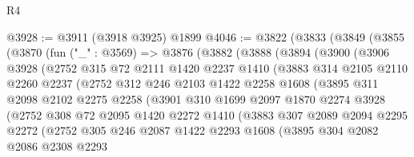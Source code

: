 \begin{lexlean}{R4}
\begin{coremodule}
@3928 := @3911 (@3918 @3925) @1899
@4046 := @3822
    (@3833
      (@3849
        (@3855
          (@3870
            (fun ("_" : @3569) =>
            @3876
              (@3882
                (@3888
                  (@3894
                    (@3900
                      (@3906
                        @3928
                        (@2752
                          @315
                          @72
                          @2111
                          @1420
                          @2237
                          @1410
                          (@3883
                            @314
                            @2105
                            @2110
                            @2260
                            @2237
                            (@2752
                              @312
                              @246
                              @2103
                              @1422
                              @2258
                              @1608
                              (@3895
                                @311
                                @2098
                                @2102
                                @2275
                                @2258
                                (@3901
                                  @310
                                  @1699
                                  @2097
                                  @1870
                                  @2274
                                  @3928
                                  (@2752
                                    @308
                                    @72
                                    @2095
                                    @1420
                                    @2272
                                    @1410
                                    (@3883
                                      @307
                                      @2089
                                      @2094
                                      @2295
                                      @2272
                                      (@2752
                                        @305
                                        @246
                                        @2087
                                        @1422
                                        @2293
                                        @1608
                                        (@3895
                                          @304
                                          @2082
                                          @2086
                                          @2308
                                          @2293

\end{coremodule}
\end{lexlean}

